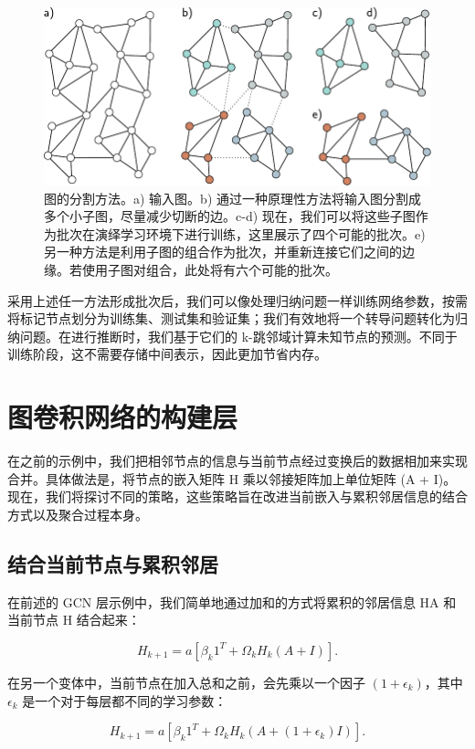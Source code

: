 \documentclass[lang=cn,newtx,10pt,scheme=chinese]{elegantbook}
\begin{document}
\begin{figure}[ht!]
\centering
\includegraphics[width=0.7\linewidth]{PDFFigures/UDLChap13PDF/GraphPartitioning.pdf}
\caption{图的分割方法。a) 输入图。b) 通过一种原理性方法将输入图分割成多个小子图，尽量减少切断的边。c-d) 现在，我们可以将这些子图作为批次在演绎学习环境下进行训练，这里展示了四个可能的批次。e) 另一种方法是利用子图的组合作为批次，并重新连接它们之间的边缘。若使用子图对组合，此处将有六个可能的批次。}
\end{figure}


采用上述任一方法形成批次后，我们可以像处理归纳问题一样训练网络参数，按需将标记节点划分为训练集、测试集和验证集；我们有效地将一个转导问题转化为归纳问题。在进行推断时，我们基于它们的 k-跳邻域计算未知节点的预测。不同于训练阶段，这不需要存储中间表示，因此更加节省内存。
\section{图卷积网络的构建层}
在之前的示例中，我们把相邻节点的信息与当前节点经过变换后的数据相加来实现合并。具体做法是，将节点的嵌入矩阵 H 乘以邻接矩阵加上单位矩阵 (A + I)。现在，我们将探讨不同的策略，这些策略旨在改进当前嵌入与累积邻居信息的结合方式以及聚合过程本身。

\subsection{结合当前节点与累积邻居}

在前述的 GCN 层示例中，我们简单地通过加和的方式将累积的邻居信息 HA 和当前节点 H 结合起来：

\begin{equation}
H_{k+1} = a \left[ \beta_k 1^T + \Omega_k H_k (A + I) \right]. 
\end{equation}

在另一个变体中，当前节点在加入总和之前，会先乘以一个因子 \((1 + \epsilon_k)\)，其中 \(\epsilon_k\) 是一个对于每层都不同的学习参数：

\begin{equation}
H_{k+1} = a \left[ \beta_{k} 1^T + \Omega_k H_k (A + (1 + \epsilon_k)I) \right]. 
\end{equation}
\end{document}
